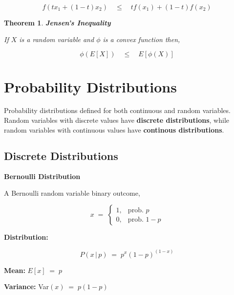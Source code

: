 \documentclass[10pt]{article}
\newtheorem{theorem}{Theorem}
\numberwithin{equation}{section}
\begin{document}
\begin{equation}
f \left( t x_1 + (1-t) x_2 \right) \quad \leq \quad t f(x_1) + (1-t) f(x_2) 
\end{equation}

\begin{theorem} \textbf{Jensen's Inequality}

If $X$ is a random variable and $\phi$ is a convex function then,

\begin{equation}
\phi \left( E[X] \right) \quad \leq \quad E[ \phi(X) ] 
\end{equation}

\end{theorem}



\section{Probability Distributions}

Probability distributions defined for both continuous and random variables.  Random variables with discrete values have \textbf{discrete distributions}, while random variables with continuous values have \textbf{continous distributions}.

\subsection{Discrete Distributions}

\noindent
\textbf{Bernoulli Distribution}

\noindent
A Bernoulli random variable binary outcome, 

$$ x \; = \; \left\{
\begin{array}{cl}
1, &  \text{prob. } p  \\
0, &  \text{prob. } 1-p 
\end{array}
 \right. $$
 
 \noindent
 \textbf{Distribution:}
 
 \begin{equation}
 P(x \, | \, p ) \; = \; p^{x} (1-p)^{(1-x)}
 \end{equation}
 
 \vspace{1mm}
 
 \noindent
 \textbf{Mean:} $E[x] \; = \;  p$
 
  \noindent
 \textbf{Variance:}  Var$(x) \; = \;  p(1-p)$
 
 \vspace{3mm}
 
\end{document}
